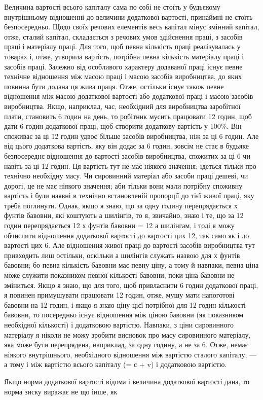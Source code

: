 Величина вартості всього капіталу сама по собі не стоїть
у будьякому внутрішньому відношенні до величини додаткової
вартості, принаймні не стоїть безпосередньо. Щодо своїх речових
елементів весь капітал мінус змінний капітал, отже, сталий капітал,
складається з речових умов здійснення праці, з засобів праці
і матеріалу праці. Для того, щоб певна кількість праці реалізувалась
у товарах і, отже, утворила вартість, потрібна певна
кількість матеріалу праці і засобів праці. Залежно від особливого
характеру додаваної праці існує певне технічне відношення
між масою праці і масою засобів виробництва, до яких повинна
бути додана ця жива праця. Отже, остільки існує також певне
відношення між масою додаткової вартості або додаткової праці
і масою засобів виробництва. Якщо, наприклад, час, необхідний
для виробництва заробітної плати, становить 6 годин на день,
то робітник мусить працювати 12 годин, щоб дати 6 годин додаткової
праці, щоб створити додаткову вартість у 100\%. Він
споживає за ці 12 годин удвоє більше засобів виробництва, ніж
за ці 6 годин. Але від цього додаткова вартість, яку він додає
за 6 годин, зовсім не стає в будьяке безпосереднє відношення
до вартості засобів виробництва, спожитих за ці 6 чи навіть
за ці 12 годин. Ця вартість тут не має ніякого значення; ідеться
тільки про технічно необхідну масу. Чи сировинний матеріал або
засоби праці дешеві, чи дорогі, це не має ніякого значення;
аби тільки вони мали потрібну споживну вартість і були наявні
в технічно встановленій пропорції до тієї живої праці, яку треба
поглинути. Однак, якщо я знаю, що за одну годину перепрядається
х фунтів бавовни, які коштують а шилінгів, то я, звичайно,
знаю і те, що за 12 годин перепрядається 12 х фунтів
бавовни = 12 а шилінгам, і тоді я можу обчислити відношення
додаткової вартості до вартості цих 12, так само як і до вартості
цих 6. Але відношення живої праці до вартості засобів
виробництва тут привходить лиш остільки, оскільки а шилінгів
служать назвою для х фунтів бавовни; бо певна кількість бавовни
має певну ціну, а тому й навпаки, певна ціна може служити
показником певної кількості бавовни, поки ціна бавовни
не зміниться. Якщо я знаю, що для того, щоб привласнити 6 годин
додаткової праці, я повинен примушувати працювати 12 годин,
отже, мушу мати напоготові бавовни на 12 годин, і якщо я знаю
ціну цієї потрібної для 12 годин кількості бавовни, то посередньо
існує відношення між ціною бавовни (як показником необхідної
кількості) і додатковою вартістю. Навпаки, з ціни сировинного
матеріалу я ніколи не можу зробити висновок про масу сировинного
матеріалу, яка може бути перепрядена, наприклад, за
одну годину, а не за 6. Отже, немає ніякого внутрішнього, необхідного
відношення між вартістю сталого капіталу, — а тому
і між вартістю всього капіталу (= с + v) і додатковою вартістю.

Якщо норма додаткової вартості відома і величина додаткової
вартості дана, то норма зиску виражає не що інше, як
\parbreak{}  %
